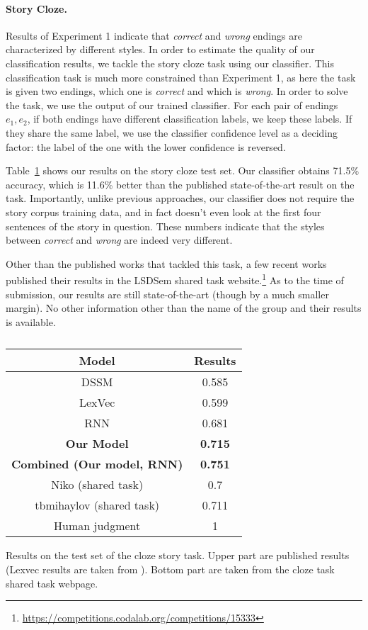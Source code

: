 \documentclass[11pt,a4paper]{article}
\newcommand{\tabref}[1]{Table~\ref{#1}}
\begin{document}
\paragraph{Story Cloze.}
Results of Experiment 1 indicate that {\it correct} and {\it wrong} endings are characterized by different styles.
In order to estimate the quality of our classification results, we tackle the story cloze task using our classifier.
This classification task is much more constrained than Experiment 1, as here the task is given two endings, which one is {\it correct} and which is {\it wrong}.
In order to solve the task, we use the output of our trained classifier. 
For each pair of endings $e_1,e_2$, if both endings have different classification labels, we keep these labels. 
If they share the same label, we use the classifier confidence level as a deciding factor: the label of the one with the lower confidence is reversed. 

\tabref{cloze_results} shows our results on the story cloze test set. Our classifier obtains 71.5\% accuracy, which is 11.6\% better than the published state-of-the-art result on the task.
Importantly, unlike previous approaches, our classifier does not require the story corpus training data, and in fact doesn't even look at the first four sentences of the story in question.
These numbers indicate that the styles between {\it correct} and {\it wrong} are indeed very different.

Other than the published works that tackled this task, a few  recent works published their results in the LSDSem shared task website.\footnote{\url{https://competitions.codalab.org/competitions/15333}} 
As to the time of submission, our results are still state-of-the-art (though by a much smaller margin). No other information other than the name of the group and their results is available.

\begin{table}[!t]
\begin{center}
\begin{tabular}{|c|c|} \hline
{\bf Model} & {\bf Results} \\ \hline
{DSSM} \cite{Mostafazadeh:2016} & 0.585 \\ \hline
{ LexVec} \cite{Salle:2016} & 0.599 \\ \hline
{RNN}		& 0.681 \\ \hline
{\bf Our Model} & {\bf 0.715} \\ \hline
{\bf Combined (Our model, RNN)} & {\bf 0.751} \\ \hline\hline
{ Niko (shared task)}	& 0.7\\ \hline\hline
{ tbmihaylov (shared task)} & 0.711\\ \hline\hline
Human judgment & 1 \\ \hline
\end{tabular}
\end{center}
\caption{\label{cloze_results}}
Results on the test set of the cloze story task. 
Upper part are published results (Lexvec results are taken from \cite{Speer:2016}).
Bottom part are taken from the cloze task shared task webpage.
\end{table}
\end{document}
